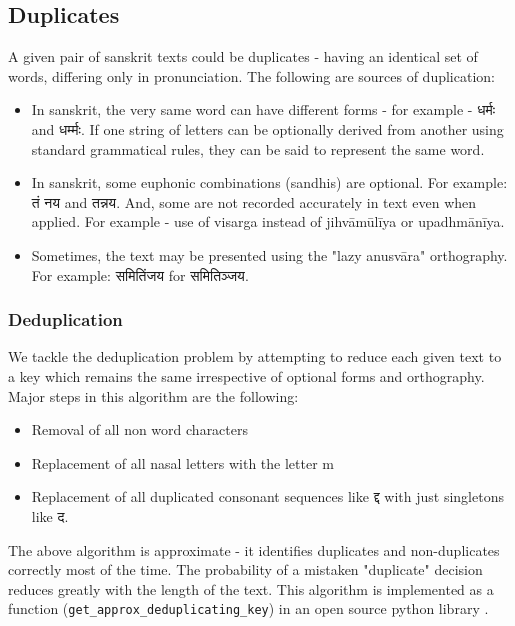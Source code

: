 \documentclass[11pt]{article}
\begin{document}
\subsection{Duplicates}
A given pair of sanskrit texts could be duplicates - having an identical set of words, differing only in pronunciation. The following are sources of duplication:

\begin{itemize}
\tightlist
\item
In sanskrit, the very same word can have different forms - for example - {\skt धर्मः} and {\skt धर्म्मः}. If one string of letters can be optionally derived from another using standard grammatical rules, they can be said to represent the same word.

\item
In sanskrit, some euphonic combinations (sandhis) are optional. For example: {\skt तं नय} and {\skt तन्नय}. And, some are not recorded accurately in text even when applied. For example - use of visarga instead of jihvāmūlīya or upadhmānīya.

\item
Sometimes, the text may be presented using the "lazy anusvāra" orthography. For example: {\skt समितिंजय} for {\skt समितिञ्जय}.
\end{itemize}

\subsubsection{Deduplication}
We tackle the deduplication problem by attempting to reduce each given text to a key which remains the same irrespective of optional forms and orthography. Major steps in this algorithm are the following:

\begin{itemize}
\tightlist
\item
Removal of all non word characters

\item
Replacement of all nasal letters with the letter m

\item
Replacement of all duplicated consonant sequences like {\skt द्द} with just singletons like {\skt द}.
\end{itemize}

The above algorithm is approximate - it identifies duplicates and non-duplicates correctly most of the time. The probability of a mistaken "duplicate" decision reduces greatly with the length of the text. This algorithm is implemented as a function (\verb^get_approx_deduplicating_key^) in an open source python library \cite{indic_transliteration_py}. 
\end{document}
